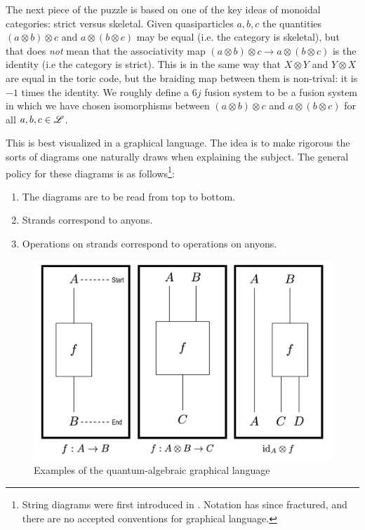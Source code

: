 \documentclass{article}
\theoremstyle{definition}
\numberwithin{figure}{section}
\begin{document}
The next piece of the puzzle is based on one of the key ideas of monoidal categories: strict versus skeletal. Given quasiparticles $a,b,c$ the quantities $(a\otimes b)\otimes c$ and $a\otimes (b\otimes c)$ may be equal (i.e. the category is skeletal), but that does \textit{not} mean that the associativity map $(a\otimes b)\otimes c\to a\otimes (b\otimes c)$ is the identity (i.e the category is strict). This is in the same way that $X\otimes Y$ and $Y\otimes X$ are equal in the toric code, but the braiding map between them is non-trival: it is $-1$ times the identity. We roughly define a $6j$ fusion system to be a fusion system in which we have chosen isomorphisms between $(a\otimes b)\otimes c$ and $a\otimes (b\otimes c)$ for all $a,b,c\in \mathscr{L}$.

This is best visualized in a graphical language. The idea is to make rigorous the sorts of diagrams one naturally draws when explaining the subject. The general policy for these diagrams is as follows\footnote{String diagrams were first introduced in \cite{hotz1965algebraisierung}. Notation has since fractured, and there are no accepted conventions for graphical language.}:

\begin{enumerate}
\item The diagrams are to be read from top to bottom.
\item Strands correspond to anyons.
\item Operations on strands correspond to operations on anyons.
\end{enumerate}

\begin{figure}
\begin{center}
\includegraphics[scale=0.2]{graphical-language}
\caption{Examples of the quantum-algebraic graphical language}
\label{fig:graphical-language}
\end{center}
\end{figure}
\end{document}
